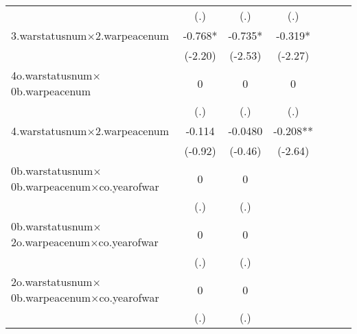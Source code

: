 {\begin{tabular}{l*{6}{c}}
                    &         (.)         &         (.)         &         (.)         &                     &                     &                     \\
[1em]
3.warstatusnum$\times$2.warpeacenum&      -0.768*  &      -0.735*  &      -0.319*  &                     &                     &                     \\
                    &     (-2.20)         &     (-2.53)         &     (-2.27)         &                     &                     &                     \\
[1em]
4o.warstatusnum$\times$0b.warpeacenum&           0         &           0         &           0         &                     &                     &                     \\
                    &         (.)         &         (.)         &         (.)         &                     &                     &                     \\
[1em]
4.warstatusnum$\times$2.warpeacenum&      -0.114         &     -0.0480         &      -0.208** &                     &                     &                     \\
                    &     (-0.92)         &     (-0.46)         &     (-2.64)         &                     &                     &                     \\
[1em]
0b.warstatusnum$\times$0b.warpeacenum$\times$co.yearofwar&           0         &           0         &                     &                     &                     &                     \\
                    &         (.)         &         (.)         &                     &                     &                     &                     \\
[1em]
0b.warstatusnum$\times$2o.warpeacenum$\times$co.yearofwar&           0         &           0         &                     &                     &                     &                     \\
                    &         (.)         &         (.)         &                     &                     &                     &                     \\
[1em]
2o.warstatusnum$\times$0b.warpeacenum$\times$co.yearofwar&           0         &           0         &                     &                     &                     &                     \\
                    &         (.)         &         (.)         &                     &                     &                     &                     \\

\end{tabular}}
